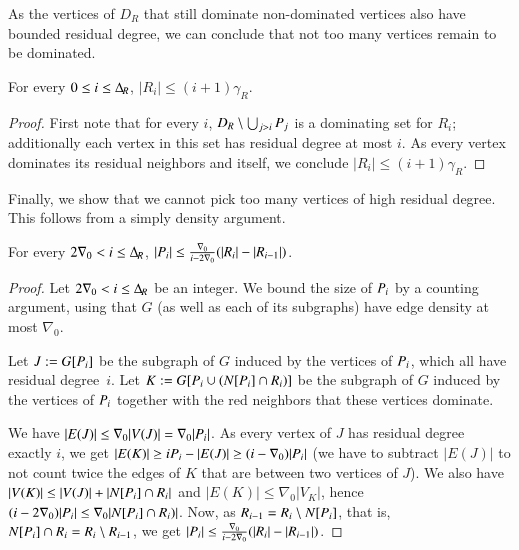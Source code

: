 As the vertices of $D_R$ that still dominate non-dominated vertices also
have bounded residual degree, we can conclude that not too many
vertices remain to be dominated.
\begin{lemma}\label{lem:h1}
  For every $0\leq i\le {\Delta_{\hspace{-1pt}R}}$, $|R_i| \le (i+1)\gamma_R$.
\end{lemma}
\begin{proof}
  First note that for every $i$,
  $D_R\setminus \bigcup_{j>i}P_j$ is a dominating
  set for $R_i$; additionally each vertex in this set has residual
  degree at most $i$. As every vertex dominates its residual neighbors and
  itself, we conclude $|R_i|\le (i+1)\gamma_R$.
\end{proof}

Finally, we show that we cannot pick too many vertices of high
residual degree. This follows from a simply density argument.

\begin{lemma}\label{lem:h2}
  For every $2\nabla_0< i\leq {\Delta_{\hspace{-1pt}R}}$, $|P_i|\leq \frac{\nabla_0}{i-2\nabla_0}(|R_i|-|R_{i-1}|)$.
\end{lemma}

\begin{proof}
Let $2\nabla_0< i\le {\Delta_{\hspace{-1pt}R}}$ be an integer. We bound the size of $P_i$
  by a counting argument, using that $G$ (as well as each of its
  subgraphs) have edge density at most $\nabla_0$.

  Let $J := G[P_i]$ be the subgraph of $G$ induced by the
  vertices of $P_i$, which all have residual degree~$i$. Let
  $K := G[P_i \cup (N[P_i]\cap R_i)]$ be the subgraph of $G$
  induced by the vertices of $P_i$ together with the red
  neighbors that these vertices dominate.

  We have $|E(J)| \leq  \nabla_0|V(J)| = \nabla_0|P_i|$. As every
  vertex of $J$ has residual degree exactly $i$, we get
  $|E(K)| \geq iP_i - |E(J)| \geq (i-\nabla_0)|P_i|$ (we have to
  subtract $|E(J)|$ to not count twice the edges of $K$ that are
  between two vertices of $J$).  We also have
  $|V(K)| \le |V(J)| + |N[P_i]\cap R_i|$ and $|E(K)| \leq \nabla_0|V_K|$, hence
  $(i-2\nabla_0)|P_i| \leq \nabla_0|N[P_i]\cap R_i)|$.
  Now, as $R_{i-1} = R_i \setminus N[P_{i}]$, that is,
  $N[P_i]\cap R_i=R_i\setminus R_{i-1}$, we get
  $|P_i|\leq \frac{\nabla_0}{i-2\nabla_0}(|R_i|-|R_{i-1}|)$.
\end{proof}


